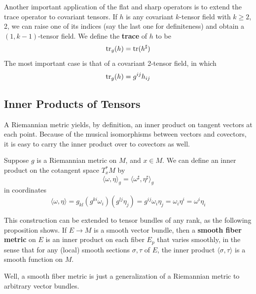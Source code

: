 \documentclass[../main.tex]{subfiles}
\begin{document}
Another important application of the flat and sharp operators is to extend the trace operator to covariant tensors. If $h$ is any covariant $k$-tensor field with $k \geq 2$, 2, we can raise one of its indices (say the last one for definiteness) and obtain a $(1, k-1)$-tensor field. We define the \textbf{trace} of $h$ to be
\begin{equation}
	\operatorname{tr}_g(h) = \operatorname{tr}(h^\sharp)
\end{equation}
The most important case is that of a covariant 2-tensor field, in which
\begin{equation}
	\operatorname{tr}_g(h) = g^{ij} h_{ij}
\end{equation}

\subsection{Inner Products of Tensors}
A Riemannian metric yields, by definition, an inner product on tangent vectors at each point. Because of the musical isomorphisms between vectors and covectors, it is easy to carry the inner product over to covectors as well.

Suppose $g$ is a Riemannian metric on $M$, and $x\in M$. We can define an inner product on the cotangent space $T^*_xM$ by
\begin{equation}
	\langle \omega, \eta \rangle_g = \langle \omega^\sharp, \eta^\sharp \rangle_g
\end{equation}
in coordinates
\begin{equation*}
	\langle \omega, \eta \rangle = g_{kl} (g^{ki} \omega_i) (g^{lj} \eta_j) = g^{ij} \omega_i \eta_j = \omega_i \eta^i = \omega^i \eta_i
\end{equation*}

This construction can be extended to tensor bundles of any rank, as the following proposition shows. If $E \to M$ is a smooth vector bundle, then a \textbf{smooth fiber metric} on $E$ is an inner product on each fiber $E_p$ that varies smoothly, in the sense that for any (local) smooth sections $\sigma, \tau$ of $E$, the inner product $\langle \sigma, \tau \rangle$ is a smooth function on $M$.

\begin{remark}
	Well, a smooth fiber metric is just a generalization of a Riemannian metric to arbitrary vector bundles.
\end{remark}
\end{document}
